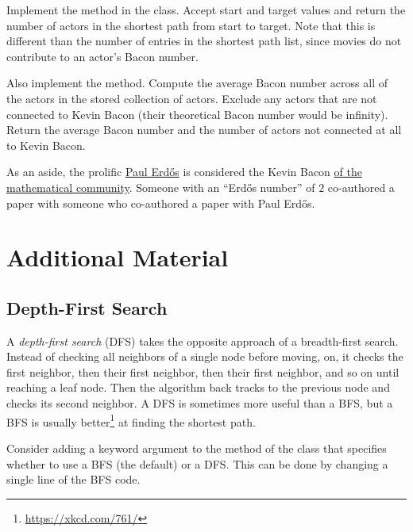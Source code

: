 \begin{problem}
Implement the  method in the  class.
Accept start and target values and return the number of actors in the shortest path from start to target.
Note that this is different than the number of entries in the shortest path list, since movies do not contribute to an actor's Bacon number.

Also implement the  method.
Compute the average Bacon number across all of the actors in the stored collection of actors.
Exclude any actors that are not connected to Kevin Bacon (their theoretical Bacon number would be infinity).
Return the average Bacon number and the number of actors not connected at all to Kevin Bacon.
\end{problem}

As an aside, the prolific \href{https://en.wikipedia.org/wiki/Erd%C5%91s_number}{Paul Erd\H{o}s} is considered the Kevin Bacon \href{https://xkcd.com/599/}{of the mathematical community}.
Someone with an ``Erd\H{o}s number'' of $2$ co-authored a paper with someone who co-authored a paper with Paul Erd\H{o}s.

\newpage

\section*{Additional Material} %

\subsection*{Depth-First Search} %


A \emph{depth-first search} (DFS) takes the opposite approach of a breadth-first search.
Instead of checking all neighbors of a single node before moving, on, it checks the first neighbor, then their first neighbor, then their first neighbor, and so on until reaching a leaf node.
Then the algorithm back tracks to the previous node and checks its second neighbor.
A DFS is sometimes more useful than a BFS, but a BFS is usually better\footnote{\url{https://xkcd.com/761/}} at finding the shortest path.

Consider adding a keyword argument to the  method of the  class that specifies whether to use a BFS (the default) or a DFS.
This can be done by changing a single line of the BFS code.

